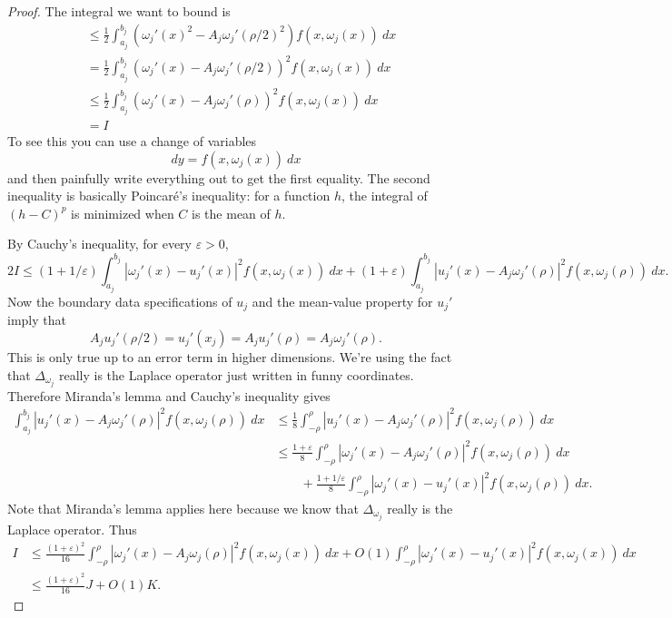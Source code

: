 \documentclass[reqno,12pt,letterpaper]{amsart}
\theoremstyle{definition}
\numberwithin{equation}{section}
\begin{document}
\begin{proof}
The integral we want to bound is
\begin{align*}
& \leq \frac{1}{2} \int_{a_j}^{b_j} (\omega_j'(x)^2 - A_j \omega_j'(\rho/2)^2 ) f(x, \omega_j(x)) ~dx \\
&= \frac{1}{2} \int_{a_j}^{b_j} (\omega_j'(x) - A_j \omega_j'(\rho/2))^2 f(x, \omega_j(x)) ~dx \\
&\leq \frac{1}{2} \int_{a_j}^{b_j} (\omega_j'(x) - A_j \omega_j'(\rho))^2 f(x, \omega_j(x)) ~dx\\
&= I
\end{align*}
To see this you can use a change of variables
$$dy = f(x, \omega_j(x)) ~dx$$
and then painfully write everything out to get the first equality.
The second inequality is basically Poincar\'e's inequality: for a function $h$, the integral of $(h - C)^p$ is minimized when $C$ is the mean of $h$.

By Cauchy's inequality, for every $\varepsilon > 0$,
$$2I \leq (1 + 1/\varepsilon) \int_{a_j}^{b_j} |\omega_j'(x) - u_j'(x)|^2 f(x, \omega_j(x)) ~dx + (1 + \varepsilon) \int_{a_j}^{b_j} |u_j'(x) - A_j \omega_j'(\rho)|^2 f(x, \omega_j(\rho)) ~dx.$$ Now the boundary data specifications of $u_j$ and the mean-value property for $u_j'$ imply that
$$A_j u_j'(\rho/2) = u_j'(x_j) = A_j u_j'(\rho) = A_j\omega_j'(\rho).$$
This is only true up to an error term in higher dimensions. We're using the fact that $\Delta_{\omega_j}$ really is the Laplace operator just written in funny coordinates.
Therefore Miranda's lemma and Cauchy's inequality gives
\begin{align*}
\int_{a_j}^{b_j} |u_j'(x) - A_j \omega_j'(\rho)|^2 f(x, \omega_j(\rho)) ~dx &\leq \frac{1}{8} \int_{-\rho}^{\rho} |u_j'(x) - A_j \omega_j'(\rho)|^2 f(x, \omega_j(\rho)) ~dx\\
&\leq \frac{1 + \varepsilon}{8} \int_{-\rho}^\rho |\omega_j'(x) - A_j \omega_j'(\rho)|^2 f(x, \omega_j(\rho)) ~dx \\
&\qquad + \frac{1 + 1/\varepsilon}{8} \int_{-\rho}^\rho |\omega_j'(x) - u_j'(x)|^2 f(x, \omega_j(\rho)) ~dx.
\end{align*}
Note that Miranda's lemma applies here because we know that $\Delta_{\omega_j}$ really is the Laplace operator.
Thus
\begin{align*}
I &\leq \frac{(1 + \varepsilon)^2}{16} \int_{-\rho}^\rho |\omega_j'(x) - A_j \omega_j(\rho)|^2 f(x, \omega_j(x)) ~dx + O(1) \int_{-\rho}^\rho |\omega_j'(x) - u_j'(x)|^2f(x, \omega_j(x)) ~dx\\
&\leq \frac{(1 + \varepsilon)^2}{16} J + O(1) K.
\end{align*}


\end{proof}
\end{document}
